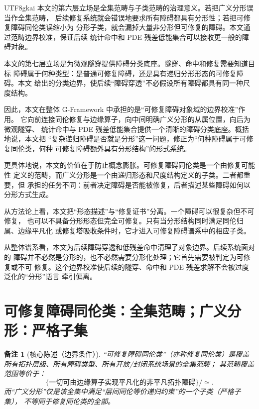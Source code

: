 \documentclass[12pt]{article}
\newtheorem{remark}{备注}[section]
\newcommand{\GFramework}{\textsf{G-Framework}}
\begin{document}
\begin{CJK*}{UTF8}{gkai}
本文的第六层立场是全集范畴与子类范畴的治理意义。若把广义分形误当作全集范畴，
后续修复系统就会错误地要求所有障碍都具有分形性；若把可修复障碍同伦类误缩小为
分形子类，就会漏掉大量非分形但可修复的障碍。本文通过范畴边界校准，保证后续
统计命中和 PDE 残差低能集合可以接收更一般的障碍对象。

本文的第七层立场是为微观隧穿提供障碍分类底座。隧穿、命中和修复需要知道目标
障碍属于何种类型：是普通可修复障碍，还是具有递归分形形态的可修复障碍。本文
给出的分类边界，使后续“障碍穿透”不必假设所有障碍都具有同一种尺度结构。

因此，本文在整体 \GFramework{} 中承担的是“可修复障碍对象域的边界校准”作用。
它向前连接同伦修复与边缘算子，向中间明确广义分形的从属位置，向后为微观隧穿、
统计命中与 PDE 残差低能集合提供一个清晰的障碍分类底座。概括地说，本文把
“复杂递归障碍是否就是分形”这一问题，修正为“何种障碍属于可修复同伦类，何种
可修复障碍额外具有分形结构”的形式系统。

更具体地说，本文的价值在于防止概念膨胀。可修复障碍同伦类是一个由修复可能性
定义的范畴，而广义分形是一个由递归形态和尺度结构定义的子类。二者都重要，但
承担的任务不同：前者决定障碍是否能被修复，后者描述某些障碍如何以分形方式生成。

从方法论上看，本文把“形态描述”与“修复证书”分离。一个障碍可以很复杂但不可修复，
也可以不具备分形形态但完全可修复。只有当分形结构同时满足同伦归属、边缘平凡化
或修复塔吸收条件时，它才进入可修复障碍谱系中的相应子类。

从整体谱系看，本文为后续障碍穿透和低残差命中清理了对象边界。后续系统面对的
障碍并不必然是分形的，也不必然需要分形化处理；它首先需要被判定为可修复或不可
修复。这个边界校准使后续的隧穿、命中和 PDE 残差求解不会被过度泛化的“分形”语言
牵引偏离。

\setcounter{tocdepth}{3}
\setcounter{secnumdepth}{3}
\tableofcontents
\clearpage

\section{可修复障碍同伦类：全集范畴；广义分形：严格子集}
\label{sec:tex29-ch1}

\begin{remark}[核心陈述（边界条件）]
“可修复障碍同伦类”（亦称修复同伦类）是覆盖所有拓扑层级、所有障碍类型、所有开放/封闭系统场景的全集范畴；
其范畴覆盖范围等价于：
\[
  \{\text{一切可由边缘算子实现平凡化的非平凡拓扑障碍}\}/\simeq.
\]
而“广义分形”仅是该全集中满足“层间同伦等价递归约束”的一个子类（严格子集），
不等同于修复同伦类的全部。
\end{remark}


\end{CJK*}
\end{document}
